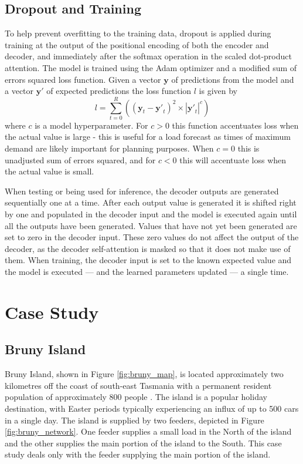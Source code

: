 \documentclass[conference]{IEEEtran}
\begin{document}
\subsection{Dropout and Training}
To help prevent overfitting to the training data, dropout \cite{srivastava14a} is applied during training at the output of the positional encoding of both the encoder and decoder, and immediately after the softmax operation in the scaled dot-product attention.
The model is trained using the Adam optimizer \cite{Kingma2014} and a modified sum of errors squared loss function.
Given a vector $\boldsymbol{y}$ of predictions from the model and a vector $\boldsymbol{y'}$ of expected predictions the loss function $l$ is given by 
\begin{equation}
l = \sum_{t=0}^{R}((\boldsymbol{y}_t - \boldsymbol{y'}_t)^2 \times |\boldsymbol{y'}_t|^c)
\end{equation}
where $c$ is a model hyperparameter.
For $c>0$ this function accentuates loss when the actual value is large - this is useful for a load forecast as times of maximum demand are likely important for planning purposes.
When $c=0$ this is unadjusted sum of errors squared, and for $c<0$ this will accentuate loss when the actual value is small.

When testing or being used for inference, the decoder outputs are generated sequentially one at a time.
After each output value is generated it is shifted right by one and populated in the decoder input and the model is executed again until all the outputs have been generated.
Values that have not yet been generated are set to zero in the decoder input.
These zero values do not affect the output of the decoder, as the decoder self-attention is masked so that it does not make use of them.
When training, the decoder input is set to the known expected value and the model is executed --- and the learned parameters updated --- a single time.


\section{Case Study}

\subsection{Bruny Island}
Bruny Island, shown in Figure \ref{fig:bruny_map}, is located approximately two kilometres off the coast of south-east Tasmania with a permanent resident population of approximately 800 people \cite{census2016}.
The island is a popular holiday destination, with Easter periods typically experiencing an influx of up to 500 cars in a single day.
The island is supplied by two feeders, depicted in Figure \ref{fig:bruny_network}.
One feeder supplies a small load in the North of the island and the other supplies the main portion of the island to the South.
This case study deals only with the feeder supplying the main portion of the island.
\end{document}
